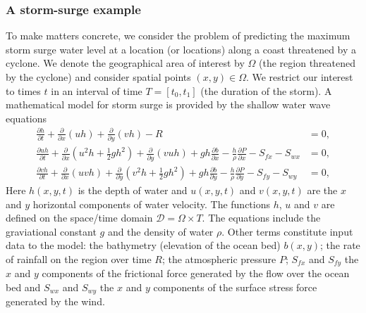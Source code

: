 

\subsubsection*{A storm-surge example}
To make matters concrete, we consider the problem of predicting the maximum 
storm surge water level at a location (or locations) along a coast threatened by a cyclone. We denote the geographical area of interest by $\Omega$ 
(the region threatened by the cyclone) and consider 
spatial points $(x,y) \in \Omega$. We restrict our interest to times $t$ in an interval of time $T = [t_0, t_1]$ (the duration of the storm). 
A mathematical model for storm surge is provided 
by the shallow water wave equations~\parencite{tan1992shallow}
\begin{subequations}
 \label{eqn:storm} 
\begin{align}
\frac{\partial h}{\partial t} +
\frac{\partial }{\partial x} \left(uh\right) + \frac{\partial }{\partial y} \left(vh\right) -R & =  0 ,\\
\frac{\partial uh}{\partial t} +
\frac{\partial }{\partial x} \left(u^2h +  \frac12 gh^2 \right) 
+ \frac{\partial }{\partial y} \left(vuh\right) + gh \frac{\partial b}{\partial x} 
- \frac{h}{\rho} \frac{\partial P}{\partial  x} - S_{fx} - S_{wx}  &= 0 ,   \\
\frac{\partial vh}{\partial t} +
\frac{\partial }{\partial x} \left(uvh  \right) 
+ \frac{\partial }{\partial y} \left(v^2h + \frac12 g h^2 \right) + gh \frac{\partial b}{\partial y} 
- \frac{h}{\rho} \frac{\partial P}{\partial  y} - S_{fy} -  S_{wy}& = 0,  
\end{align}
\end{subequations}
Here $h(x,y,t)$ is the depth of water and $u(x,y,t)$ and $v(x,y,t)$ are the $x$ and $y$ horizontal components of water velocity. 
The functions $h$, $u$ and $v$ are defined on the space/time domain  $ \mathcal{D} = \Omega \times T$. 
The equations include the graviational constant $g$ and the density of water $\rho$. Other terms constitute input data to the model: the bathymetry  (elevation of the ocean bed)  $b(x,y)$; the rate of rainfall on the region over time $R$; the atmospheric pressure $P$; %
$S_{fx}$ and $S_{fy}$ the $x$ and $y$ components of the frictional force generated by the flow over the ocean bed 
 and $S_{wx}$ and $S_{wy}$ the $x$ and $y$ components of the surface stress force generated by the wind.



